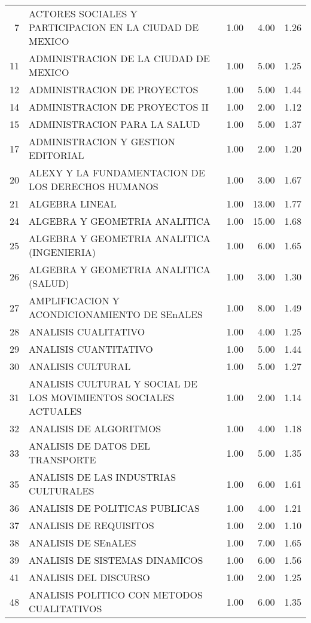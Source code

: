 \begin{table}[ht]
\begin{tabular}{rlrrr}
  7 & ACTORES SOCIALES Y PARTICIPACION EN LA CIUDAD DE MEXICO & 1.00 & 4.00 & 1.26 \\ 
  11 & ADMINISTRACION DE LA CIUDAD DE MEXICO & 1.00 & 5.00 & 1.25 \\ 
  12 & ADMINISTRACION DE PROYECTOS & 1.00 & 5.00 & 1.44 \\ 
  14 & ADMINISTRACION DE PROYECTOS II & 1.00 & 2.00 & 1.12 \\ 
  15 & ADMINISTRACION PARA LA SALUD & 1.00 & 5.00 & 1.37 \\ 
  17 & ADMINISTRACION Y GESTION EDITORIAL & 1.00 & 2.00 & 1.20 \\ 
  20 & ALEXY Y LA FUNDAMENTACION DE LOS DERECHOS HUMANOS & 1.00 & 3.00 & 1.67 \\ 
  21 & ALGEBRA LINEAL & 1.00 & 13.00 & 1.77 \\ 
  24 & ALGEBRA Y GEOMETRIA ANALITICA & 1.00 & 15.00 & 1.68 \\ 
  25 & ALGEBRA Y GEOMETRIA ANALITICA (INGENIERIA) & 1.00 & 6.00 & 1.65 \\ 
  26 & ALGEBRA Y GEOMETRIA ANALITICA (SALUD) & 1.00 & 3.00 & 1.30 \\ 
  27 & AMPLIFICACION Y ACONDICIONAMIENTO DE SEnALES & 1.00 & 8.00 & 1.49 \\ 
  28 & ANALISIS CUALITATIVO & 1.00 & 4.00 & 1.25 \\ 
  29 & ANALISIS CUANTITATIVO & 1.00 & 5.00 & 1.44 \\ 
  30 & ANALISIS CULTURAL & 1.00 & 5.00 & 1.27 \\ 
  31 & ANALISIS CULTURAL Y SOCIAL DE LOS MOVIMIENTOS SOCIALES ACTUALES & 1.00 & 2.00 & 1.14 \\ 
  32 & ANALISIS DE ALGORITMOS & 1.00 & 4.00 & 1.18 \\ 
  33 & ANALISIS DE DATOS DEL TRANSPORTE & 1.00 & 5.00 & 1.35 \\ 
  35 & ANALISIS DE LAS INDUSTRIAS CULTURALES & 1.00 & 6.00 & 1.61 \\ 
  36 & ANALISIS DE POLITICAS PUBLICAS & 1.00 & 4.00 & 1.21 \\ 
  37 & ANALISIS DE REQUISITOS & 1.00 & 2.00 & 1.10 \\ 
  38 & ANALISIS DE SEnALES & 1.00 & 7.00 & 1.65 \\ 
  39 & ANALISIS DE SISTEMAS DINAMICOS & 1.00 & 6.00 & 1.56 \\ 
  41 & ANALISIS DEL DISCURSO & 1.00 & 2.00 & 1.25 \\ 
  48 & ANALISIS POLITICO CON METODOS CUALITATIVOS & 1.00 & 6.00 & 1.35 \\ 

\end{tabular}
\end{table}
